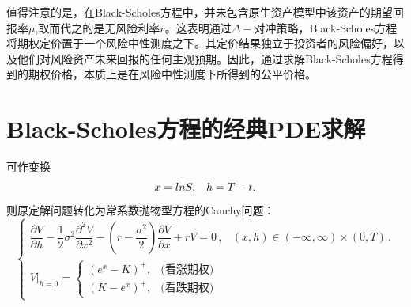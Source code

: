 \documentclass[oneside]{sysuthesis}
\begin{document}
值得注意的是，在Black-Scholes方程中，并未包含原生资产模型中该资产的期望回报率$\mu$,取而代之的是无风险利率$r$。这表明通过$\Delta-$对冲策略，Black-Scholes方程将期权定价置于一个风险中性测度之下。其定价结果独立于投资者的风险偏好，以及他们对风险资产未来回报的任何主观预期。因此，通过求解Black-Scholes方程得到的期权价格，本质上是在风险中性测度下所得到的公平价格。

\section{Black-Scholes方程的经典PDE求解}

可作变换
\begin{equation*}
	x=ln S,\hspace{0.3cm}h=T-t.
\end{equation*}
则原定解问题转化为常系数抛物型方程的Cauchy问题：
\[
\begin{cases}
	\dfrac{\partial V}{\partial h} - \dfrac{1}{2}\sigma^2 \dfrac{\partial^2 V}{\partial x^2} - (r-\dfrac{\sigma^2}{2})\dfrac{\partial V}{\partial x}+rV = 0\,, & (x,h)\in (-\infty,\infty)\times(0,T)\,.\\[10pt]
	V|_{h=0} = 
	\begin{cases}
		(e^x - K)^+, & \text{(看涨期权)} \\
		(K - e^x)^+, & \text{(看跌期权)}
	\end{cases}
\end{cases}
\]
\end{document}
